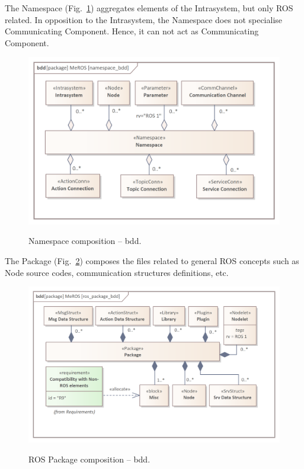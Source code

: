 \documentclass[11pt,oneside,a4paper]{article}
\begin{document}
	\pagebreak
	
	The Namespace (Fig.~\ref{fig:namespace_bdd}) aggregates elements of the Intrasystem, but only ROS related. In opposition to the Intrasystem, the Namespace does not specialise Communicating Component. Hence, it can not act as Communicating Component.
	
	
	\begin{figure}[H]
		\centering
		\begin{center}
			{\includegraphics[scale=1.0]{img/meros_pkg/namespace_bdd.png}}
		\end{center}
		\caption{Namespace composition -- bdd.} 
		\label{fig:namespace_bdd}
	\end{figure}
	
	
	The Package (Fig.~\ref{fig:ros_package_bdd}) composes the files related to general ROS concepts such as Node source codes, communication structures definitions, etc. 
	
	
	\begin{figure}[H]
		\centering
		\begin{center}
			{\includegraphics[scale=1.0]{img/meros_pkg/ros_package_bdd.png}}
		\end{center}
		\caption{ROS Package composition -- bdd.} 
		\label{fig:ros_package_bdd}
	\end{figure}
		
\end{document}
